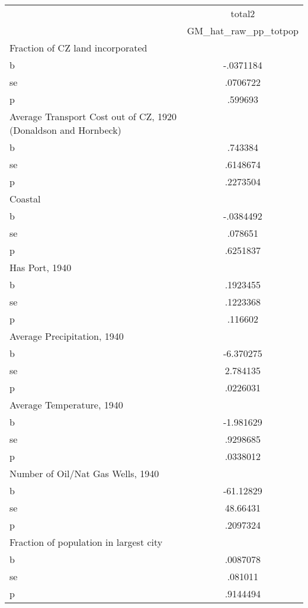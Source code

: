 \begin{tabular}{l*{1}{c}}
\toprule
                &   total2\\
                &GM\_hat\_raw\_pp\_totpop\\
\midrule
Fraction of CZ land incorporated&         \\
b               &-.0371184\\
se              & .0706722\\
p               &  .599693\\
\midrule
Average Transport Cost out of CZ, 1920 (Donaldson and Hornbeck)&         \\
b               &  .743384\\
se              & .6148674\\
p               & .2273504\\
\midrule
Coastal         &         \\
b               &-.0384492\\
se              &  .078651\\
p               & .6251837\\
\midrule
Has Port, 1940  &         \\
b               & .1923455\\
se              & .1223368\\
p               &  .116602\\
\midrule
Average Precipitation, 1940&         \\
b               &-6.370275\\
se              & 2.784135\\
p               & .0226031\\
\midrule
Average Temperature, 1940&         \\
b               &-1.981629\\
se              & .9298685\\
p               & .0338012\\
\midrule
Number of Oil/Nat Gas Wells, 1940&         \\
b               &-61.12829\\
se              & 48.66431\\
p               & .2097324\\
\midrule
Fraction of population in largest city&         \\
b               & .0087078\\
se              &  .081011\\
p               & .9144494\\

\end{tabular}

